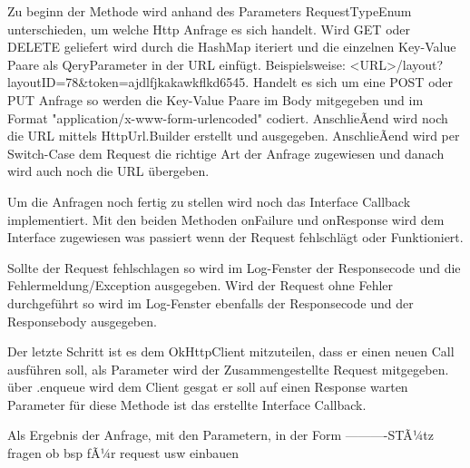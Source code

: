 Zu beginn der Methode wird anhand des Parameters RequestTypeEnum unterschieden, um welche Http Anfrage es sich handelt. Wird GET oder DELETE geliefert wird durch die HashMap iteriert und die einzelnen Key-Value Paare als QeryParameter in der URL einfügt. Beispielsweise: <URL>/layout?layoutID=78&token=ajdlfjkakawkflkd6545.
Handelt es sich um eine POST oder PUT Anfrage so werden die Key-Value Paare im Body mitgegeben und im Format "application/x-www-form-urlencoded" codiert. AnschlieÃend wird noch die URL mittels HttpUrl.Builder erstellt und ausgegeben. 
AnschlieÃend wird per Switch-Case dem Request die richtige Art der Anfrage zugewiesen und danach wird auch noch die URL übergeben. 

Um die Anfragen noch fertig zu stellen wird noch das Interface Callback implementiert. Mit den beiden Methoden onFailure und onResponse wird dem Interface zugewiesen was passiert wenn der Request fehlschlägt oder Funktioniert. 

Sollte der Request fehlschlagen so wird im Log-Fenster der Responsecode und die Fehlermeldung/Exception ausgegeben. 
Wird der Request ohne Fehler durchgeführt so wird im Log-Fenster ebenfalls der Responsecode und der Responsebody ausgegeben.

Der letzte Schritt ist es dem OkHttpClient mitzuteilen, dass er einen neuen Call ausführen soll, als Parameter wird der Zusammengestellte Request mitgegeben. über .enqueue wird dem Client gesgat er soll auf einen Response warten Parameter für diese Methode ist das erstellte Interface Callback.






Als Ergebnis der Anfrage, mit den Parametern, in der Form
----------STÃ¼tz fragen ob bsp fÃ¼r request usw einbauen



